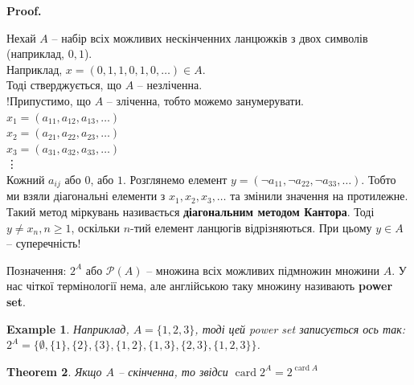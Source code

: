 \documentclass[a4paper, 14pt]{extarticle}
\makeatletter
\theoremstyle{theoremdd}
\newtheorem{theorem}{Theorem}[subsection]
\theoremstyle{theoremdd}
\theoremstyle{theoremdd}
\theoremstyle{theoremdd}
\theoremstyle{theoremdd}
\newtheorem{example}[theorem]{Example}
\theoremstyle{theoremdd}
\theoremstyle{theoremdd}
\theoremstyle{theoremdd}
\theoremstyle{theoremdd}
\theoremstyle{theoremdd}
\theoremstyle{theoremdd}
\theoremstyle{theoremdd}
\theoremstyle{theoremdd}
\theoremstyle{theoremdd}
\theoremstyle{theoremdd}
\renewenvironment{proof}[1][Proof.\\]{\par
\pushQED{\hfill \qed}%
\normalfont \topsep6\p@\@plus6\p@\relax
\trivlist
\item\relax
{\bfseries
#1\@addpunct{.}}\hspace\labelsep\ignorespaces
}{%
\popQED\endtrivlist\@endpefalse
}
\DeclareMathOperator{\card}{card}
\makeatother
\begin{document}
\begin{proof}
Нехай $A$ -- набір всіх можливих нескінченних ланцюжків з двох символів (наприклад, $0,1$).\\
Наприклад, $x = (0,1,1,0,1,0,\dots) \in A$.\\
Тоді стверджується, що $A$ -- незліченна.\\
!Припустимо, що $A$ -- зліченна, тобто можемо занумерувати.\\
$x_1 = (a_{11},a_{12},a_{13},\dots)$\\
$x_2 = (a_{21},a_{22},a_{23},\dots)$\\
$x_3 = (a_{31},a_{32},a_{33},\dots)$\\
\vdots \\
Кожний $a_{ij}$ або $0$, або $1$. Розглянемо елемент $y = (\neg a_{11}, \neg a_{22}, \neg a_{33},\dots)$. Тобто ми взяли діагональні елементи з $x_1,x_2,x_3,\dots$ та змінили значення на протилежне. Такий метод міркувань називається \textbf{діагональним методом Кантора}. Тоді $y \neq x_n, n \geq 1$, оскільки $n$-тий елемент ланцюгів відрізняються. При цьому $y \in A$ -- суперечність!
\end{proof}

Позначення: $2^A$ або $\mathcal{P}(A)$ -- множина всіх можливих підмножин множини $A$. У нас чіткої термінології нема, але англійською таку множину називають \textbf{power set}.

\begin{example}
Наприклад, $A = \{1,2,3\}$, тоді цей power set записується ось так:\\
$2^A = \{ \emptyset, \{1\}, \{2\}, \{3\}, \{1,2\}, \{1,3\}, \{2,3\}, \{1,2,3\} \}$.
\end{example}

\begin{theorem}
Якщо $A$ -- скінченна, то звідси $\card 2^A = 2^{\card A}$
\end{theorem}
\end{document}
